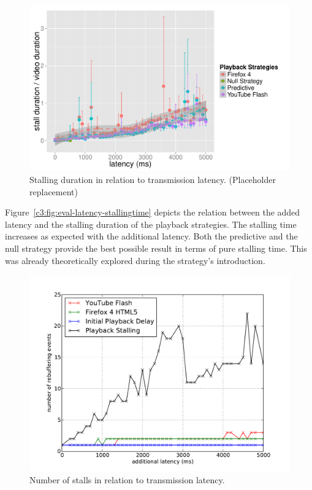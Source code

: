 \begin{figure}[htb]
    \centering
    \includegraphics[width=\textwidth]{images/R-playbackemulation-stallduration-latency.pdf}
    \caption{Stalling duration in relation to transmission latency. (Placeholder replacement)}
    \label{c3:fig:R-eval-latency-stallingtime}
\end{figure}


Figure~\ref{c3:fig:eval-latency-stallingtime} depicts the relation between the added latency and the stalling duration of the playback strategies. The stalling time increases as expected with the additional latency. Both the predictive and the null strategy provide the best possible result in terms of pure stalling time. This was already theoretically explored during the strategy's introduction.

\begin{figure}[htb]
    \centering
    \includegraphics[width=\textwidth]{images/eval-latency-frequency.pdf}
    \caption{Number of stalls in relation to transmission latency.}
    \label{c3:fig:eval-latency-numstalls}
\end{figure}

